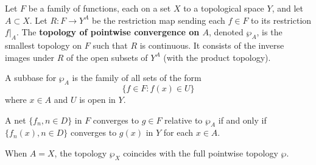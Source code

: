 Let $F$ be a family of functions, each on a set $X$ to a topological space $Y$, and let $A \subset X$. Let $R : F \to Y^A$ be the restriction map sending each $f \in F$ to its restriction $f|_A$. The \textbf{topology of pointwise convergence on $A$}, denoted $\wp_A$, is the smallest topology on $F$ such that $R$ is continuous. It consists of the inverse images under $R$ of the open subsets of $Y^A$ (with the product topology).

A subbase for $\wp_A$ is the family of all sets of the form
$$\{f \in F : f(x) \in U\}$$
where $x \in A$ and $U$ is open in $Y$.

A net $\{f_n, n \in D\}$ in $F$ converges to $g \in F$ relative to $\wp_A$ if and only if $\{f_n(x), n \in D\}$ converges to $g(x)$ in $Y$ for each $x \in A$.

When $A = X$, the topology $\wp_X$ coincides with the full pointwise topology $\wp$.
